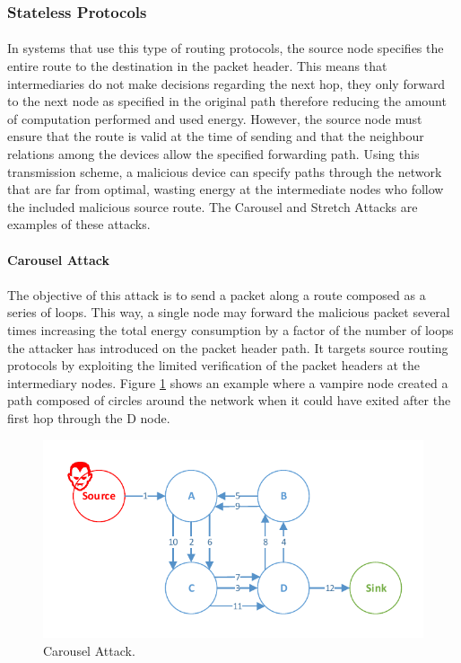 \subsubsection{Stateless Protocols}
\label{sec:source_routing}
\paragraph{}
In systems that use this type of routing protocols, the source node specifies the entire route to the destination in the packet header. This means that intermediaries do not make decisions regarding the next hop, they only forward to the next node as specified in the original path therefore reducing the amount of computation performed and used energy. However, the source node must ensure that the route is valid at the time of sending and that the neighbour relations among the devices allow the specified forwarding path. Using this transmission scheme, a malicious device can specify paths through the network that are far from optimal, wasting energy at the intermediate nodes who follow the included malicious source route. The Carousel and Stretch Attacks are examples of these attacks.

\paragraph{\textbf{Carousel Attack}}
\paragraph{}
The objective of this attack is to send a packet along a route composed as a series of loops. This way, a single node may forward the malicious packet several times increasing the total energy consumption by a factor of the number of loops the attacker has introduced on the packet header path. It targets source routing protocols by exploiting the limited verification of the packet headers at the intermediary nodes. Figure \ref{fig:carousel_attack} shows an example where a vampire node created a path composed of circles around the network when it could have exited after the first hop through the D node.
 
\begin{figure}[h]
  \centering
  \includegraphics[width=0.9\linewidth]{figures/Carousel_Attack.pdf}
  \caption{Carousel Attack.}
  \label{fig:carousel_attack}
\end{figure}

